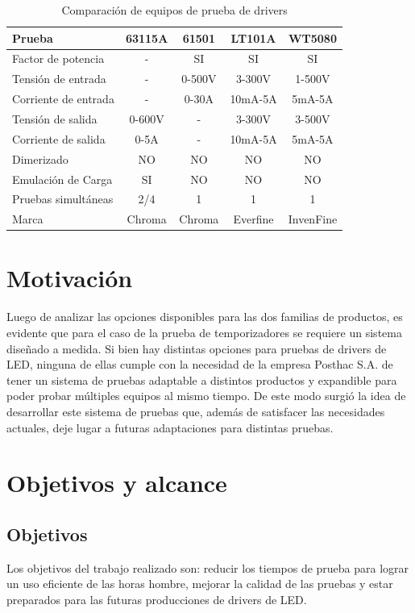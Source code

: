 	\begin{table}[h]
	\centering
	\caption[Tabla de comparación de equipos de prueba de drivers]{Comparación de equipos de prueba de drivers}
	\begin{tabular}{l c c c c}    
		\toprule
		\textbf{Prueba} 	 & \textbf{63115A} & \textbf{61501}& \textbf{LT101A}		& \textbf{WT5080}  \\
		\midrule
		Factor de potencia & - & SI & SI & SI \\		
		Tensión de entrada	 & - & 0-500V & 3-300V & 1-500V \\
		Corriente de entrada& - & 0-30A & 10mA-5A & 5mA-5A \\
		Tensión de salida & 0-600V & - & 3-300V & 3-500V \\		
		Corriente de salida & 0-5A & - & 10mA-5A & 5mA-5A \\		
		Dimerizado & NO & NO & NO & NO \\		
		Emulación de Carga & SI & NO & NO & NO \\
		Pruebas simultáneas &2/4 & 1 & 1 & 1 \\
		Marca & Chroma & Chroma & Everfine & InvenFine \\
		\bottomrule
		\hline
	\end{tabular}
	\label{tab:ProbadoresDrivers}
\end{table}

\section{Motivación}

Luego de analizar las opciones disponibles para las dos familias de productos, es evidente que para el caso de la prueba de temporizadores se requiere un sistema diseñado a medida. Si bien hay distintas opciones para pruebas de drivers de LED, ninguna de ellas cumple con la necesidad de la empresa Posthac S.A. de tener un sistema de pruebas adaptable a distintos productos y expandible para poder probar múltiples equipos al mismo tiempo. De este modo surgió la idea de desarrollar este sistema de pruebas que, además de satisfacer las necesidades actuales, deje lugar a futuras adaptaciones para distintas pruebas.

\section{Objetivos y alcance}
\subsection{Objetivos}
Los objetivos del trabajo realizado son: reducir los tiempos de prueba para lograr un uso eficiente de las horas hombre, mejorar la calidad de las pruebas y estar preparados para las futuras producciones de drivers de LED.
